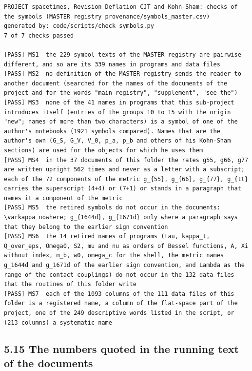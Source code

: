 \documentclass[
  10pt,
]{article}
\begin{document}
\begin{verbatim}
PROJECT spacetimes, Revision_Deflation_CJT_and_Kohn-Sham: checks of the symbols (MASTER registry provenance/symbols_master.csv)
generated by: code/scripts/check_symbols.py
7 of 7 checks passed

[PASS] MS1  the 229 symbol texts of the MASTER registry are pairwise different, and so are its 339 names in programs and data files
[PASS] MS2  no definition of the MASTER registry sends the reader to another document (searched for the names of the documents of the project and for the words "main registry", "supplement", "see the")
[PASS] MS3  none of the 41 names in programs that this sub-project introduces itself (entries of the groups 10 to 15 with the origin "new"; names of more than two characters) is a symbol of one of the author's notebooks (1921 symbols compared). Names that are the author's own (G_S, G_V, V_0, p_a, p_b and others of his Kohn-Sham sections) are used for the objects for which he uses them
[PASS] MS4  in the 37 documents of this folder the rates g55, g66, g77 are written upright 562 times and never as a letter with a subscript; each of the 72 components of the metric g_{55}, g_{66}, g_{77}, g_{tt} carries the superscript (4+4) or (7+1) or stands in a paragraph that names it a component of the metric
[PASS] MS5  the retired symbols do not occur in the documents: \varkappa nowhere; g_{1644d}, g_{1671d} only where a paragraph says that they belong to the earlier sign convention
[PASS] MS6  the 14 retired names of programs (tau, kappa_t, Q_over_eps, Omega0, S2, mu and nu as orders of Bessel functions, A, Xi without index, m_b, w0, omega_c for the shell, the metric names g_1644d and g_1671d of the earlier sign convention, and Lambda as the range of the contact couplings) do not occur in the 132 data files that the routines of this folder write
[PASS] MS7  each of the 1093 columns of the 111 data files of this folder is a registered name, a column of the flat-space part of the project, one of the 249 descriptive words listed in the script, or (213 columns) a systematic name
\end{verbatim}

\hypertarget{the-numbers-quoted-in-the-running-text-of-the-documents}{%
\subsection{5.15 The numbers quoted in the running text of the
documents}\label{the-numbers-quoted-in-the-running-text-of-the-documents}}
\end{document}
